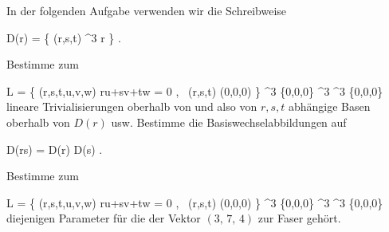 \setcounter{section}{1}


In der folgenden Aufgabe verwenden wir die Schreibweise

\mavergleichskette
{\vergleichskette
{D(r)
}
{ = }{ \left\{ (r,s,t) \in \R^3  \mid  r         \right\}
}
{  }{
}
{    }{
}
{   }{
}
}
{}{}{.}

{}
{





Bestimme zum

\mavergleichskettedisp
{\vergleichskette
{L
}
{ =} { \left\{ (r,s,t,u,v,w)  \mid  ru+sv+tw = 0 , \, (r,s,t) \neq (0,0,0)       \right\}
}
{ \subseteq} { \R^3 \setminus \{0,0,0\} \times \R^3
}
{ \longrightarrow} { \R^3 \setminus \{0,0,0\}
}
{ } {
}
}
{}{}{}
lineare Trivialisierungen oberhalb von
 und
 also von $r,s,t$ abhängige Basen oberhalb von $D(r)$ usw. Bestimme die Basiswechselabbildungen auf

\mavergleichskette
{\vergleichskette
{D(rs)
}
{ = }{ D(r) \cap D(s)
}
{  }{
}
{    }{
}
{   }{
}
}
{}{}{.}





}
{} {}

{}
{





Bestimme zum

\mavergleichskettedisp
{\vergleichskette
{L
}
{ =} { \left\{ (r,s,t,u,v,w)  \mid  ru+sv+tw = 0 , \, (r,s,t) \neq (0,0,0)       \right\}
}
{ \subseteq} { \R^3 \setminus \{0,0,0\} \times \R^3
}
{ \longrightarrow} { \R^3 \setminus \{0,0,0\}
}
{ } {
}
}
{}{}{}
diejenigen Parameter
 für die der Vektor $\left(  3   , \,   7  , \,   4                 \right)$ zur Faser
 gehört.





}
{} {}

